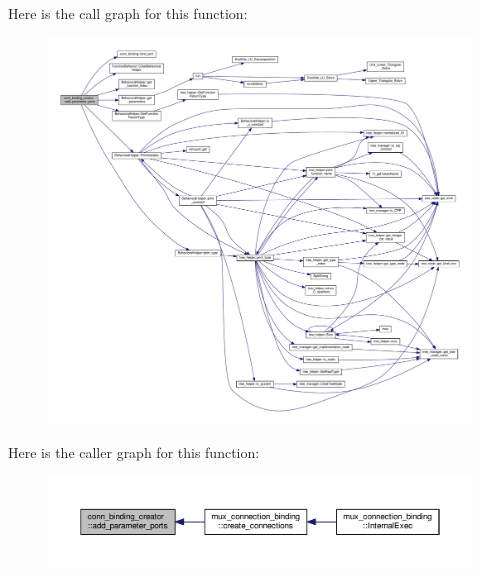 Here is the call graph for this function\+:
\nopagebreak
\begin{figure}[H]
\begin{center}
\leavevmode
\includegraphics[width=350pt]{dc/d1b/classconn__binding__creator_a82010cffa9f6621f20ad7be071dc83c7_cgraph}
\end{center}
\end{figure}
Here is the caller graph for this function\+:
\nopagebreak
\begin{figure}[H]
\begin{center}
\leavevmode
\includegraphics[width=350pt]{dc/d1b/classconn__binding__creator_a82010cffa9f6621f20ad7be071dc83c7_icgraph}
\end{center}
\end{figure}
\mbox{\label{classconn__binding__creator_a4e1f943323e06ccd6148578c17b53169}} 
